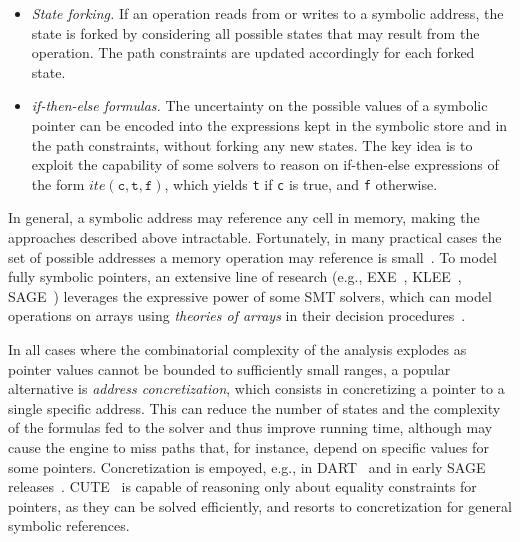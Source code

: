 \begin{itemize}

\item {\em State forking.} If an operation reads from or writes to a symbolic address, the state is forked by considering all possible states that may result from the operation. The path constraints are updated accordingly for each forked state.

\item {\em if-then-else formulas.} The uncertainty on the possible values of a symbolic pointer can be encoded into the expressions kept in the symbolic store and in the path constraints, without forking any new states. The key idea is to exploit the capability of some solvers to reason on if-then-else expressions of the form $ite(\texttt{c}, \texttt{t}, \texttt{f})$, which yields \texttt{t} if \texttt{c} is true, and \texttt{f} otherwise. %
\end{itemize}

\noindent In general, a symbolic address may reference any cell in memory, making the approaches described above intractable. Fortunately, in many practical cases the set of possible addresses a memory operation may reference is small~\cite{BITBLAZE-ICISS08}. To model fully symbolic pointers, an extensive line of research  (e.g., {\sc EXE}~\cite{EXE-CCS06}, {\sc KLEE}~\cite{KLEE-OSDI08}, {\sc SAGE}~\cite{EGL-ISSTA09}) leverages the expressive power of some SMT solvers, which can model operations on arrays using {\em theories of arrays} in their decision procedures~\cite{STP-CAV07}. 

In all cases where the combinatorial complexity of the analysis explodes as pointer values cannot be bounded to sufficiently small ranges, a popular alternative is {\em address concretization}, which consists in concretizing a pointer to a single specific address. This can reduce the number of states and the complexity of the formulas fed to the solver and thus improve running time, although may cause the engine to miss paths that, for instance, depend on specific values for some pointers. Concretization is empoyed, e.g., in {\sc DART}~\cite{DART-PLDI05} and in early {\sc SAGE} releases~\cite{EGL-ISSTA09}. {\sc CUTE}~\cite{CUTE-FSE13} is capable of reasoning only about equality constraints for pointers, as they can be solved efficiently, and resorts to concretization for general symbolic references. %

